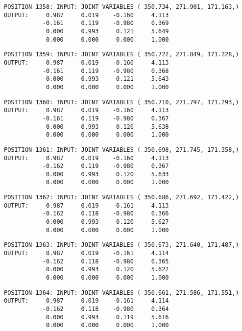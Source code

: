 \begin{verbatim}
POSITION 1358: INPUT: JOINT VARIABLES ( 350.734, 271.901, 171.163,)
OUTPUT:     0.987     0.019    -0.160     4.113
           -0.161     0.119    -0.980     0.369
            0.000     0.993     0.121     5.649
            0.000     0.000     0.000     1.000
\end{verbatim} \pagebreak[1]\begin{verbatim}
POSITION 1359: INPUT: JOINT VARIABLES ( 350.722, 271.849, 171.228,)
OUTPUT:     0.987     0.019    -0.160     4.113
           -0.161     0.119    -0.980     0.368
            0.000     0.993     0.121     5.643
            0.000     0.000     0.000     1.000
\end{verbatim} \pagebreak[1]\begin{verbatim}
POSITION 1360: INPUT: JOINT VARIABLES ( 350.710, 271.797, 171.293,)
OUTPUT:     0.987     0.019    -0.160     4.113
           -0.161     0.119    -0.980     0.367
            0.000     0.993     0.120     5.638
            0.000     0.000     0.000     1.000
\end{verbatim} \pagebreak[1]\begin{verbatim}
POSITION 1361: INPUT: JOINT VARIABLES ( 350.698, 271.745, 171.358,)
OUTPUT:     0.987     0.019    -0.160     4.113
           -0.162     0.119    -0.980     0.367
            0.000     0.993     0.120     5.633
            0.000     0.000     0.000     1.000
\end{verbatim} \pagebreak[1]\begin{verbatim}
POSITION 1362: INPUT: JOINT VARIABLES ( 350.686, 271.692, 171.422,)
OUTPUT:     0.987     0.019    -0.161     4.113
           -0.162     0.118    -0.980     0.366
            0.000     0.993     0.120     5.627
            0.000     0.000     0.000     1.000
\end{verbatim} \pagebreak[1]\begin{verbatim}
POSITION 1363: INPUT: JOINT VARIABLES ( 350.673, 271.640, 171.487,)
OUTPUT:     0.987     0.019    -0.161     4.114
           -0.162     0.118    -0.980     0.365
            0.000     0.993     0.120     5.622
            0.000     0.000     0.000     1.000
\end{verbatim} \pagebreak[1]\begin{verbatim}
POSITION 1364: INPUT: JOINT VARIABLES ( 350.661, 271.586, 171.551,)
OUTPUT:     0.987     0.019    -0.161     4.114
           -0.162     0.118    -0.980     0.364
            0.000     0.993     0.119     5.616
            0.000     0.000     0.000     1.000
\end{verbatim} \pagebreak[1]\begin{verbatim}

\end{verbatim}
